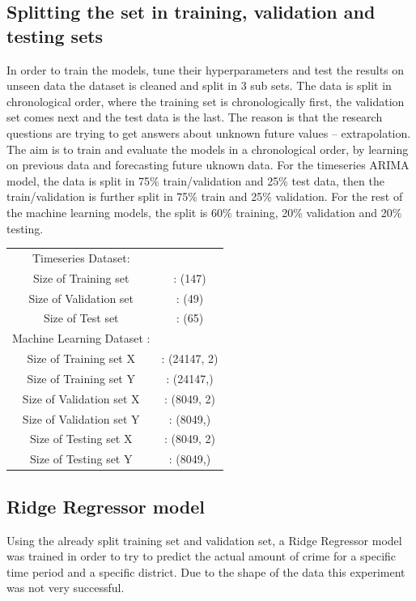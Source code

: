\documentclass[a4paper, twocolumn]{article}
\begin{document}
\subsection{Splitting the set in training, validation and testing sets}\label{split}
In order to train the models, tune their hyperparameters and test the results on unseen data the dataset is cleaned and split in 3 sub sets.
The data is split in chronological order, where the training set is chronologically first, the validation set comes next and the test data is the last. 
The reason is that the research questions are trying to get answers about unknown future values – extrapolation. 
The aim is to train and evaluate the models in a chronological order, by learning on previous data and forecasting future uknown data. 
For the timeseries ARIMA model, the data is split in 75\% train/validation and 25\% test data, then the train/validation is further split in 75\% train and 25\% validation. 
For the rest of the machine learning models, the split is 60\% training, 20\% validation and 20\% testing.

\begin{flushleft}
    \begin{tabular}{ c c }
        Timeseries Dataset:\\
        Size of Training set &    : (147)\\
        Size of Validation set &  : (49)\\
        Size of Test set &        : (65)\\
        Machine Learning Dataset  :\\
        Size of Training set X &  : (24147, 2)\\
        Size of Training set Y&   : (24147,)\\
        Size of Validation set X &: (8049, 2)\\
        Size of Validation set Y& : (8049,)\\
        Size of Testing set X &   : (8049, 2)\\
        Size of Testing set Y&    : (8049,)\\

    \end{tabular}
\end{flushleft}

\subsection{Ridge Regressor model}
Using the already split training set and validation set, a Ridge Regressor model was trained in order to
try to predict the actual amount of crime for a specific time period and a specific district. Due to the shape of 
the data this experiment was not very successful.
\end{document}
